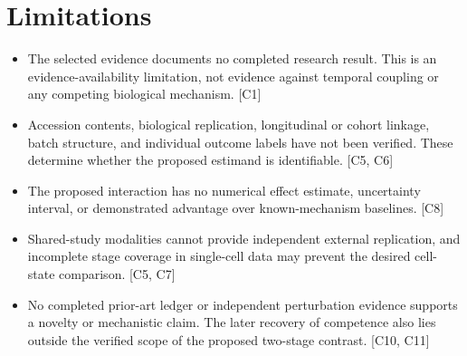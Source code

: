 \documentclass[11pt]{article}
\begin{document}
\section{Limitations}
\begin{itemize}
\item The selected evidence documents no completed research result. This is an evidence-availability limitation, not evidence against temporal coupling or any competing biological mechanism. [C1]
\item Accession contents, biological replication, longitudinal or cohort linkage, batch structure, and individual outcome labels have not been verified. These determine whether the proposed estimand is identifiable. [C5, C6]
\item The proposed interaction has no numerical effect estimate, uncertainty interval, or demonstrated advantage over known-mechanism baselines. [C8]
\item Shared-study modalities cannot provide independent external replication, and incomplete stage coverage in single-cell data may prevent the desired cell-state comparison. [C5, C7]
\item No completed prior-art ledger or independent perturbation evidence supports a novelty or mechanistic claim. The later recovery of competence also lies outside the verified scope of the proposed two-stage contrast. [C10, C11]
\end{itemize}
\end{document}
